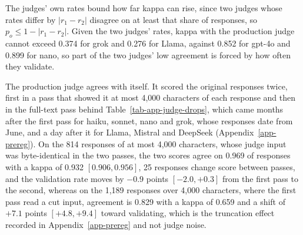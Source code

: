 The judges' own rates bound how far kappa can rise, since two judges whose
rates differ by $|r_1-r_2|$ disagree on at least that share of responses, so
$p_o\le 1-|r_1-r_2|$. Given the two judges' rates, kappa with the production
judge cannot exceed 0.374 for grok
and 0.276 for Llama, against 0.852 for gpt-4o and 0.899 for nano, so part of
the two judges' low agreement is forced by how often they validate.

The production judge agrees with itself. It scored the original responses
twice, first in a pass that showed it at most 4,000 characters of each
response and then in the full-text pass behind
Table~\ref{tab-app-judge-drops}, which came months after the first pass for
haiku, sonnet, nano and grok, whose responses date from June, and a day after
it for Llama, Mistral and DeepSeek (Appendix~\ref{app-prereg}). On the 814
responses of at most 4,000 characters, whose judge input was byte-identical
in the two passes, the two scores agree on 0.969 of responses with a kappa of
0.932 $[0.906, 0.956]$, 25 responses change score between passes, and the
validation rate moves by $-0.9$ points $[-2.0, +0.3]$ from the first pass to
the second, whereas on the 1,189 responses over 4,000 characters,
where the first pass read a cut input, agreement is 0.829 with a kappa of
0.659 and a shift of $+7.1$ points $[+4.8, +9.4]$ toward validating, which
is the truncation effect recorded in Appendix~\ref{app-prereg} and not
judge noise.


